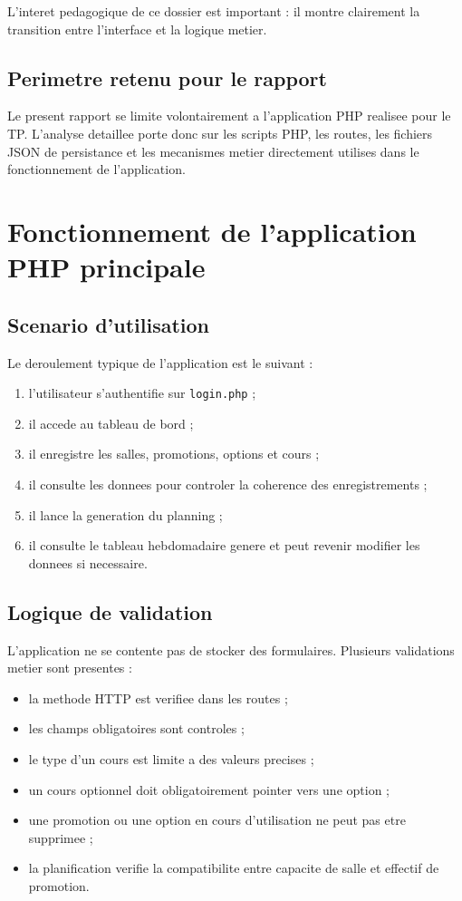 \documentclass[12pt,a4paper]{article}
\begin{document}
L'interet pedagogique de ce dossier est important : il montre clairement la transition entre l'interface et la logique metier.

\subsection{Perimetre retenu pour le rapport}
Le present rapport se limite volontairement a l'application PHP realisee pour le TP. L'analyse detaillee porte donc sur les scripts PHP, les routes, les fichiers JSON de persistance et les mecanismes metier directement utilises dans le fonctionnement de l'application.

\section{Fonctionnement de l'application PHP principale}
\subsection{Scenario d'utilisation}
Le deroulement typique de l'application est le suivant :
\begin{enumerate}
    \item l'utilisateur s'authentifie sur \texttt{login.php} ;
    \item il accede au tableau de bord ;
    \item il enregistre les salles, promotions, options et cours ;
    \item il consulte les donnees pour controler la coherence des enregistrements ;
    \item il lance la generation du planning ;
    \item il consulte le tableau hebdomadaire genere et peut revenir modifier les donnees si necessaire.
\end{enumerate}

\subsection{Logique de validation}
L'application ne se contente pas de stocker des formulaires. Plusieurs validations metier sont presentes :
\begin{itemize}
    \item la methode HTTP est verifiee dans les routes ;
    \item les champs obligatoires sont controles ;
    \item le type d'un cours est limite a des valeurs precises ;
    \item un cours optionnel doit obligatoirement pointer vers une option ;
    \item une promotion ou une option en cours d'utilisation ne peut pas etre supprimee ;
    \item la planification verifie la compatibilite entre capacite de salle et effectif de promotion.
\end{itemize}
\end{document}
